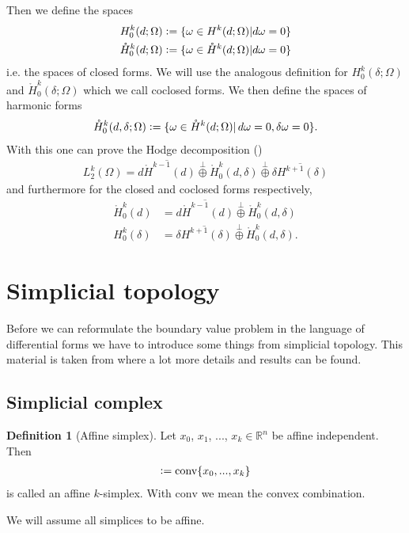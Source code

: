 \documentclass[12pt,a4paper]{article}
\numberwithin{equation}{subsection}
\numberwithin{lemma}{subsection}
\theoremstyle{definition}
\newtheorem{definition}[lemma]{Definition}
\newcommand{\real}{\mathbb{R}}
\begin{document}
Then we define the spaces 
\begin{align*}
    H^k_0(d;\Omega) &\vcentcolon= \{ \omega \in H^k(d;\Omega) 
    | d\omega = 0 \} \\
    \mathring{H}^k_0(d;\Omega) &\vcentcolon= \{ \omega \in \mathring{H}^k(d;\Omega) 
    | d\omega = 0 \}
\end{align*}
i.e. the spaces of closed forms. We will use the analogous definition for 
$H^k_0(\delta;\Omega)$ and $\mathring{H}^k_0(\delta;\Omega)$ which we call 
coclosed forms. We then define the spaces of harmonic forms
\begin{align*}
    \mathring{H}^k_0(d,\delta;\Omega) \vcentcolon= 
    \{ \omega \in \mathring{H}^k(d;\Omega) 
    | \, d\omega = 0, \delta\omega = 0 \}.
\end{align*}
With this one can prove the Hodge decomposition (\cite[Lemma 1]{arnold})
\begin{align}
    L_2^k(\Omega) = \overline{d\mathring{H}^{k-1}(d)} \stackrel{\perp}{\oplus} 
    \mathring{H}^k_0(d,\delta) \stackrel{\perp}{\oplus} 
    \overline{\delta H^{k+1}(\delta)} \label{hodge_decomposition}
\end{align}
and furthermore for the closed and coclosed forms respectively,
\begin{align}
    \mathring{H}^k_0(d) &= \overline{d\mathring{H}^{k-1}(d)} 
    \stackrel{\perp}{\oplus}
    \mathring{H}^k_0(d,\delta) \label{decomposition_closed_forms} \\
    H^k_0(\delta) &= \overline{\delta H^{k+1}(\delta)} \stackrel{\perp}{\oplus}
    \mathring{H}^k_0(d,\delta). \label{decomposition_coclosed_forms}
\end{align}

\section{Simplicial topology}

Before we can reformulate the boundary value problem in the language of 
differential forms we have to 
introduce some things from simplicial topology. This material is taken from
\cite{topology_and_geometry} where a lot more details and results can be found.

\subsection{Simplicial complex}

\begin{definition}[Affine simplex]
    Let $x_0$, $x_1$, ..., $x_k \in \real^n$ be affine independent. Then 
    \begin{align*}
    [x_0,x_1,...,x_k] \vcentcolon= \text{conv}\{x_0,...,x_k\}
    \end{align*}
    is called an affine $k$-simplex. With $\text{conv}$ we mean the 
    convex combination.
\end{definition}
\noindent We will assume all simplices to be affine.
\end{document}
